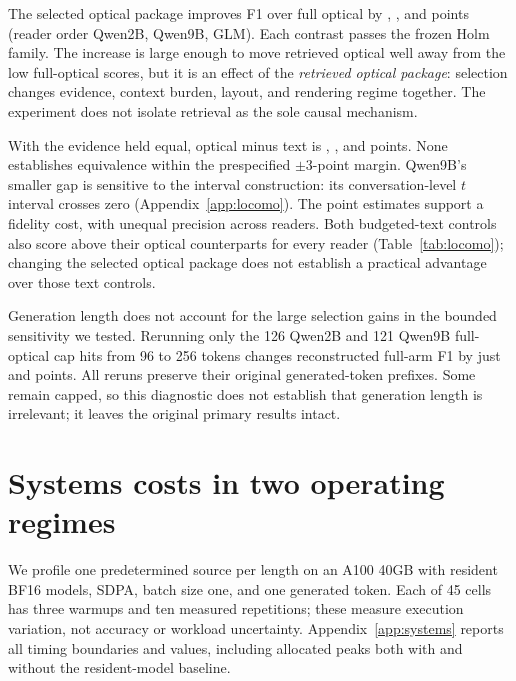 \documentclass{article}
\begin{document}
\begin{table}[t]
\centering
\caption{\textbf{LoCoMo conversation-macro F1.} All conditions answer the same 500 questions. Retrieved text and optical share evidence; the two budgeted-text controls may retain different turns.}
\label{tab:locomo}

\end{table}

The selected optical package improves F1 over full optical by , , and  points (reader order Qwen2B, Qwen9B, GLM). Each contrast passes the frozen Holm family. The increase is large enough to move retrieved optical well away from the low full-optical scores, but it is an effect of the \emph{retrieved optical package}: selection changes evidence, context burden, layout, and rendering regime together. The experiment does not isolate retrieval as the sole causal mechanism.

With the evidence held equal, optical minus text is , , and  points. None establishes equivalence within the prespecified $\pm3$-point margin. Qwen9B's smaller gap is sensitive to the interval construction: its conversation-level $t$ interval crosses zero (Appendix~\ref{app:locomo}). The point estimates support a fidelity cost, with unequal precision across readers. Both budgeted-text controls also score above their optical counterparts for every reader (Table~\ref{tab:locomo}); changing the selected optical package does not establish a practical advantage over those text controls.

Generation length does not account for the large selection gains in the bounded sensitivity we tested. Rerunning only the 126 Qwen2B and 121 Qwen9B full-optical cap hits from 96 to 256 tokens changes reconstructed full-arm F1 by just  and  points. All reruns preserve their original generated-token prefixes. Some remain capped, so this diagnostic does not establish that generation length is irrelevant; it leaves the original primary results intact.

\section{Systems costs in two operating regimes}
\label{sec:systems}
We profile one predetermined source per length on an A100 40GB with resident BF16 models, SDPA, batch size one, and one generated token. Each of 45 cells has three warmups and ten measured repetitions; these measure execution variation, not accuracy or workload uncertainty. Appendix~\ref{app:systems} reports all timing boundaries and values, including allocated peaks both with and without the resident-model baseline.
\end{document}
